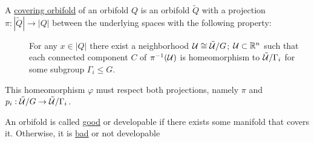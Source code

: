 \begin{defn}
A \underline{covering orbifold} of an orbifold $Q$ is an orbifold $\tilde{Q}$ with a projection $\pi:|\tilde{Q}|\rightarrow|Q|$ between the underlying spaces with the following property:
\begin{description}
  \item[] For any $x\in |Q|$ there exist a neighborhood $\mathcal{U}\cong \tilde{\mathcal{U}}/G$; $\mathcal{U}\subset \mathbb{R}^n$ such that each connected component $C$ of $\pi^{-1}(\mathcal{U})$ is homeomorphism to $\tilde{\mathcal{U}}/\Gamma_i$ for some subgroup $\Gamma_i\leqslant G$.
\end{description}
\end{defn}
\begin{remark}
This homeomorphism $\varphi$ must respect both projections, namely $\pi$ and $p_i:\tilde{\mathcal{U}}/G\rightarrow\tilde{\mathcal{U}}/\Gamma_i$.



\end{remark}

\begin{defn}
An orbifold is called \underline{good} or developable if there exists some manifold that covers it. Otherwise, it is \underline{bad} or not developable
\end{defn}







